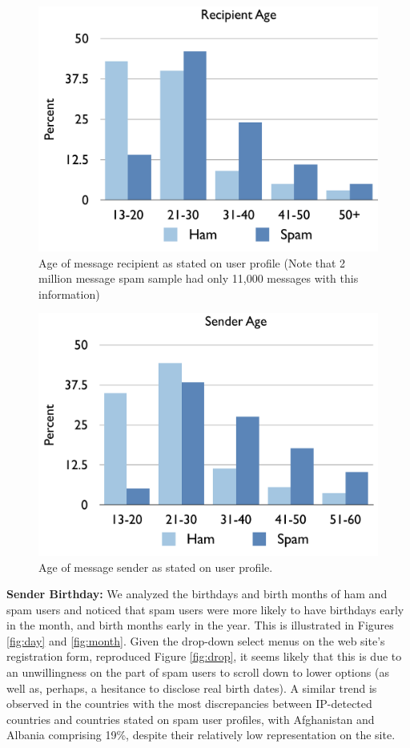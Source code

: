 \documentclass[preprint]{acm_proc_article-sp}
\begin{document}
\begin{figure}[h]
    \centering
    \includegraphics[width=\linewidth]{figures/recip-age.pdf}
    \caption{Age of message recipient as stated on user profile (Note that 2 million message spam sample 
        had only 11,000 messages with this information)}
    \label{fig:recipage}
\end{figure}

\begin{figure}[h]
    \centering
    \includegraphics[width=\linewidth]{figures/sender-age.pdf}
    \caption{Age of message sender as stated on user profile. }
    \label{fig:sendage}
\end{figure}

\textbf{Sender Birthday:} We analyzed the birthdays and birth months of ham and spam users and noticed that spam users 
were more likely to have birthdays early in the month, and birth months early in the year. This is illustrated in 
Figures \ref{fig:day} and \ref{fig:month}. Given the drop-down select menus on the web site's registration form, reproduced 
Figure \ref{fig:drop}, it seems likely that this is due to an unwillingness on the part of spam users to 
scroll down to lower options (as well as, perhaps, a hesitance to disclose real birth dates). A similar trend is 
observed in the countries with the most discrepancies between IP-detected countries and countries stated on spam 
user profiles, with Afghanistan and Albania comprising 19\%, despite their relatively low representation on the 
site. 
\end{document}
